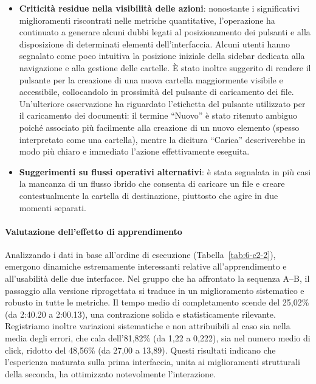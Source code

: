 \begin{itemize}
	\item \textbf{Criticità residue nella visibilità delle azioni}: nonostante i significativi miglioramenti riscontrati nelle metriche quantitative, l'operazione ha continuato a generare alcuni dubbi legati al posizionamento dei pulsanti e alla disposizione di determinati elementi dell'interfaccia. Alcuni utenti hanno segnalato come poco intuitiva la posizione iniziale della sidebar dedicata alla navigazione e alla gestione delle cartelle. È stato inoltre suggerito di rendere il pulsante per la creazione di una nuova cartella maggiormente visibile e accessibile, collocandolo in prossimità del pulsante di caricamento dei file. Un'ulteriore osservazione ha riguardato l'etichetta del pulsante utilizzato per il caricamento dei documenti: il termine ``Nuovo'' è stato ritenuto ambiguo poiché associato più facilmente alla creazione di un nuovo elemento (spesso interpretato come una cartella), mentre la dicitura ``Carica'' descriverebbe in modo più chiaro e immediato l'azione effettivamente eseguita.

	\item \textbf{Suggerimenti su flussi operativi alternativi}: è stata segnalata in più casi la mancanza di un flusso ibrido che consenta di caricare un file e creare contestualmente la cartella di destinazione, piuttosto che agire in due momenti separati.
\end{itemize}

\paragraph{Valutazione dell'effetto di apprendimento}

Analizzando i dati in base all'ordine di esecuzione (Tabella~\ref{tab:6-c2-2}), emergono dinamiche estremamente interessanti relative all'apprendimento e all'usabilità delle due interfacce. Nel gruppo che ha affrontato la sequenza A--B, il passaggio alla versione riprogettata si traduce in un miglioramento sistematico e robusto in tutte le metriche. Il tempo medio di completamento scende del 25,02\% (da 2:40.20 a 2:00.13), una contrazione solida e statisticamente rilevante. Registriamo inoltre variazioni sistematiche e non attribuibili al caso sia nella media degli errori, che cala dell'81,82\% (da 1,22 a 0,222), sia nel numero medio di click, ridotto del 48,56\% (da 27,00 a 13,89). Questi risultati indicano che l'esperienza maturata sulla prima interfaccia, unita ai miglioramenti strutturali della seconda, ha ottimizzato notevolmente l'interazione.

